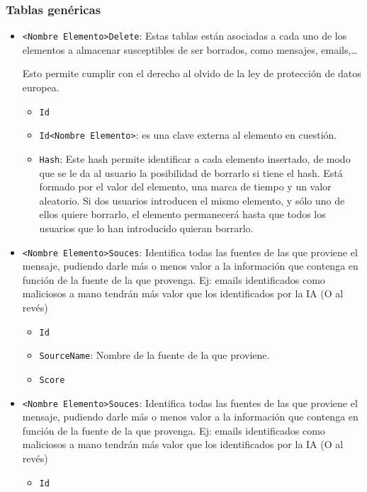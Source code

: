 \subsubsection{Tablas genéricas}
\begin{itemize}
    \item \texttt{<Nombre Elemento>Delete}: Estas tablas están asociadas a cada uno de los elementos a almacenar susceptibles de ser borrados, como mensajes, emails,…
    
    Esto permite cumplir con el derecho al olvido de la ley de protección de datos europea.
    \begin{itemize}
        \item \texttt{Id}
        \item \texttt{Id<Nombre Elemento>}: es una clave externa al elemento en cuestión.
        \item \texttt{Hash}: Este hash permite identificar a cada elemento insertado, de modo que se le da al usuario la posibilidad de borrarlo si tiene el hash. 
        Está formado por el valor del elemento, una marca de tiempo y un valor aleatorio.
        Si dos usuarios introducen el mismo elemento, y sólo uno de ellos quiere borrarlo, el elemento permanecerá hasta que todos los usuarios que lo han introducido quieran borrarlo.
    \end{itemize}
        \item \texttt{<Nombre Elemento>Souces}: Identifica todas las fuentes de las que proviene el mensaje, pudiendo darle más o menos valor a la información que contenga en función de la fuente de la que provenga. Ej: emails identificados como maliciosos a mano tendrán más valor que los identificados por la IA (O al revés)
        \begin{itemize}
            \item \texttt{Id}
            \item \texttt{SourceName}: Nombre de la fuente de la que proviene.
            \item \texttt{Score}
        \end{itemize}
    \item \texttt{<Nombre Elemento>Souces}: Identifica todas las fuentes de las que proviene el mensaje, pudiendo darle más o menos valor a la información que contenga en función de la fuente de la que provenga. Ej: emails identificados como maliciosos a mano tendrán más valor que los identificados por la IA (O al revés)
    \begin{itemize}
        \item \texttt{Id}

\end{itemize}
\end{itemize}

